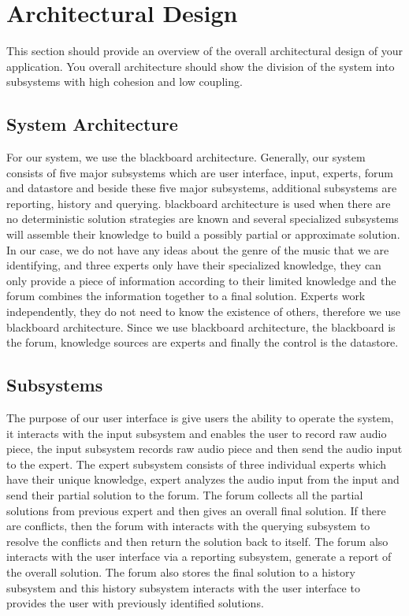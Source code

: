 \documentclass[]{article}
\begin{document}
\newpage
\section{Architectural Design}
\label{sec:architectural_design}
This section should provide an overview of the overall architectural design of your application. You overall architecture should show the division of the system into subsystems with high cohesion and low coupling.

\subsection{System Architecture}
\label{sub:system_architecture}
For our system, we use the blackboard architecture. Generally, our system consists of five major subsystems which are user interface, input, experts, forum and datastore and beside these five major subsystems, additional subsystems are reporting, history and querying. blackboard architecture is used when there are no deterministic solution strategies are known and several specialized subsystems will assemble their knowledge to build a possibly partial or approximate solution. In our case, we do not have any ideas about the genre of the music that we are identifying, and three experts only have their specialized knowledge, they can only provide a piece of information according to their limited knowledge and the forum combines the information together to a final solution. Experts work independently, they do not need to know the existence of others, therefore we use blackboard architecture. Since we use blackboard architecture, the blackboard is the forum, knowledge sources are experts and finally the control is the datastore.

\subsection{Subsystems}
\label{sub:subsystems}
The purpose of our user interface is give users the ability to operate the system, it interacts with the input subsystem and enables the user to record raw audio piece, the input subsystem records raw audio piece and then send the audio input to the expert. The expert subsystem consists of three individual experts which have their unique knowledge, expert analyzes the audio input from the input and send their partial solution to the forum. The forum collects all the partial solutions from previous expert and then gives an overall final solution. If there are conflicts, then the forum with interacts with the querying subsystem to resolve the conflicts and then return the solution back to itself. The forum also interacts with the user interface via a reporting subsystem, generate a report of the overall solution. The forum also stores the final solution to a history subsystem and this history subsystem interacts with the user interface to provides the user with previously identified solutions.
\end{document}
